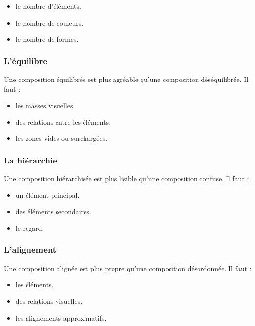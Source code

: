 \begin{itemize}
    \item {} le nombre d'éléments.
    \item {} le nombre de couleurs.
    \item {} le nombre de formes.
\end{itemize}

\subsubsection{L'équilibre}

Une composition équilibrée est plus agréable qu'une composition déséquilibrée. Il faut :

\begin{itemize}
    \item {} les masses visuelles.
    \item {} des relations entre les éléments.
    \item {} les zones vides ou surchargées.
\end{itemize}

\subsubsection{La hiérarchie}

Une composition hiérarchisée est plus lisible qu'une composition confuse. Il faut :

\begin{itemize}
    \item {} un élément principal.
    \item {} des éléments secondaires.
    \item {} le regard.
\end{itemize}

\subsubsection{L'alignement}

Une composition alignée est plus propre qu'une composition désordonnée. Il faut :

\begin{itemize}
    \item {} les éléments.
    \item {} des relations visuelles.
    \item {} les alignements approximatifs.
\end{itemize}

